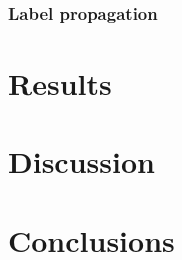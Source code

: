 \documentclass[oneside, a4paper, draft]{memoir} %
\begin{document}
\subsubsection{Label propagation}
\textcolor{gray}{\lipsum[44]}

\section{Results}
\textcolor{gray}{\lipsum[8]}

\section{Discussion}
\textcolor{gray}{\lipsum[9]}

\section{Conclusions}
\textcolor{gray}{\lipsum[3]}


\nocite{duda2001pattern}


\appendix
\end{document}

